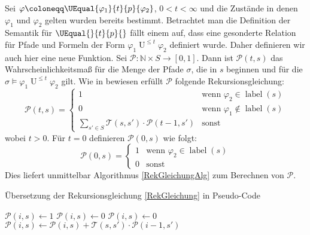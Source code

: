Sei $\varphi \coloneqq \UEqual{\varphi_1}{t}{p}{\varphi_2}$, $0<t<\infty$ und die Zustände in denen $\varphi_1$ und $\varphi_2$ gelten wurden bereits bestimmt. 
Betrachtet man die Definition der Semantik für $\UEqual{}{t}{p}{}$ fällt einem auf, dass eine gesonderte Relation für Pfade und Formeln der Form $\varphi_1 \operatorname{U}^{\leq t} \varphi_2$ definiert wurde. 
Daher definieren wir auch hier eine neue Funktion. 
Sei $\mathcal{P}:\mathbb{N}\times S \to [0,1]$. 
Dann ist $\mathcal{P}(t,s)$ das Wahrscheinlichkeitsmaß für die Menge der Pfade $\sigma$, die in $s$ beginnen und für die $\sigma\models \varphi_1 \operatorname{U}^{\leq t} \varphi_2$ gilt. 
Wie in \cite{hansson1994logic} bewiesen erfüllt $\mathcal{P}$ folgende Rekursionsgleichung:
\begin{equation}
	\mathcal{P}(t,s) = 
	\begin{cases}
		1 & \text{wenn } \varphi_2\in \operatorname{label}(s) \\
		0 & \text{wenn } \varphi_1 \notin \operatorname{label}(s) \\
		\sum_{s'\in S} \mathcal{T}(s,s')\cdot \mathcal{P}(t-1,s') & \text{sonst}
	\end{cases}
	\label{RekGleichung}
\end{equation}
wobei $t>0$. Für $t=0$ definieren $\mathcal{P}(0,s)$ wie folgt:
\begin{equation}
	\mathcal{P}(0,s) =
	\begin{cases}
		1 & \text{wenn } \varphi_2 \in \operatorname{label}(s) \\
		0 & \text{sonst }
	\end{cases}
\end{equation}
Dies liefert unmittelbar Algorithmus \ref{RekGleichungAlg} zum Berechnen von $\mathcal{P}$.

\begin{algorithm}[h]
	\caption{Übersetzung der Rekursionsgleichung \ref{RekGleichung} in Pseudo-Code \cite{hansson1994logic}}
	\label{RekGleichungAlg}
	\begin{algorithmic}
		\State $\mathcal{P}(i,s) \gets 1$
		\State $\mathcal{P}(i,s) \gets 0$
		\Else
		\State $\mathcal{P}(i,s)\gets 0$
		\State $\mathcal{P}(i,s)\gets \mathcal{P}(i,s)+\mathcal{T}(s,s')\cdot \mathcal{P}(i-1,s')$
		\EndFor
		\EndIf
		\EndIf
		\EndFor
		\EndFor
	\end{algorithmic}
\end{algorithm}

